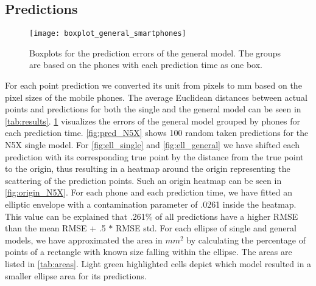 \subsection{Predictions}
\begin{figure}[t]
	\texttt{[image: boxplot\_general\_smartphones]}
	\caption{Boxplots for the prediction errors of the general model. The groups are based on the phones with each prediction time as one box.}
	\label{fig:boxplots_general}
\end{figure}
For each point prediction we converted its unit from pixels to mm based on the pixel sizes of the mobile phones.
The average Euclidean distances between actual points and predictions for both the single and the general model can be seen in \cref{tab:results}.
\cref{fig:boxplots_general} visualizes the errors of the general model grouped by phones for each prediction time.
\cref{fig:pred_N5X} shows 100 random taken predictions for the N5X single model.
For \cref{fig:ell_single} and \cref{fig:ell_general} we have shifted each prediction with its corresponding true point by the distance from the true point to the origin, thus resulting in a heatmap around the origin representing the scattering of the prediction points.
Such an origin heatmap can be seen in \cref{fig:origin_N5X}.
For each phone and each prediction time, we have fitted an elliptic envelope with a contamination parameter of .0261 inside the heatmap.
This value can be explained that .261\% of all predictions have a higher RMSE than the mean RMSE + .5 $*$ RMSE std.
For each ellipse of single and general models, we have approximated the area in $mm^{2}$ by calculating the percentage of points of a rectangle with known size falling within the ellipse. 
The areas are listed in \cref{tab:areas}.
Light green highlighted cells depict which model resulted in a smaller ellipse area for its predictions.
